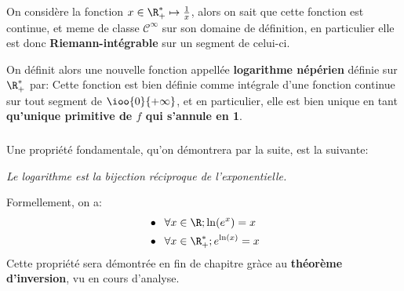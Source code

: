 \documentclass{report}
\begin{document}
   \chapter*{}

   On considère la fonction \(x \in \R_+^* \mapsto \frac{1}{x}\), alors on sait que cette fonction est continue, et meme de classe \(\mathcal{C}^\infty\) sur son domaine de définition, en particulier elle est donc \textbf{Riemann-intégrable} sur un segment de celui-ci.\<

   On définit alors une nouvelle fonction appellée \textbf{logarithme népérien} définie sur \(\R_+^*\) par:
   Cette fonction est bien définie comme intégrale d'une fonction continue sur tout segment de \(\ioo{0}{+\infty}\), et en particulier, elle est bien unique en tant \textbf{qu'unique primitive de \(f\) qui s'annule en 1}.

   \subsection*{}
   Une propriété fondamentale, qu'on démontrera par la suite, est la suivante:
   \begin{center}
      \textit{Le logarithme est la bijection réciproque de l'exponentielle.}
   \end{center}
   Formellement, on a:
   \begin{align*}
      &\bullet \;\; \forall x \in \R ; \ln(e^x) = x   \\
      &\bullet \;\; \forall x \in \R_+^* ; e^{\ln(x)} = x
   \end{align*}
   Cette propriété sera démontrée en fin de chapitre gràce au \textbf{théorème d'inversion}, vu en cours d'analyse.
\end{document}
